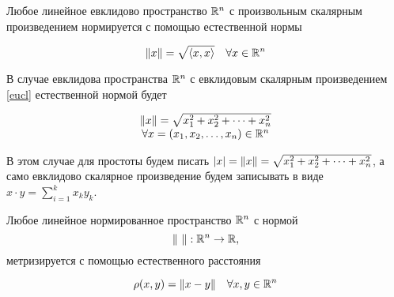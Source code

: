 \documentclass[../main.tex]{subfiles}
\begin{document}
\begin{thm}
 Любое линейное евклидово пространство $\mathbb{R}^n$ с произвольным скалярным
 произведением нормируется с помощью естественной нормы
 
 \begin{equation}
  \label{rn-norm}
  \lVert{x}\rVert = \sqrt{\left<x, x\right>} \quad \forall x \in \mathbb{R}^n
 \end{equation}
 
\end{thm}
\begin{rem}
 В случае евклидова пространства $\mathbb{R}^n$ с евклидовым скалярным 
 произведением \eqref{eucl} естественной нормой будет
 
 \[\begin{array}{c}
    \lVert{x}\rVert = \sqrt{x_1^2 + x_2^2 + \dots + x_n^2} \\
    \forall x = (x_1, x_2, \dots, x_n) \in \mathbb{R}^n
   \end{array}\]
   
 В этом случае для простоты будем писать $\left|{x}\right| = \lVert{x}\rVert = 
 \sqrt{x_1^2 + x_2^2 + \dots + x_n^2}$, а само евклидово скалярное
 произведение будем записывать в виде $x\cdot y = \sum\limits_{i=1}^k 
 x_ky_k$.

\end{rem}
\begin{thm}
 Любое линейное нормированное пространство $\mathbb{R}^n$ с нормой
 \begin{equation}
 \label{norm-disp}
 \lVert\ \rVert: \mathbb{R}^n \to \mathbb{R},
\end{equation} метризируется с помощью естественного расстояния

 \begin{equation}
  \label{nat-dist}
  \rho(x, y) = \lVert{x-y}\rVert\quad \forall x, y \in \mathbb{R}^n
 \end{equation}
 
\end{thm}
\end{document}
